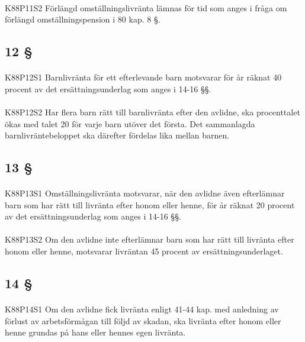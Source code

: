 \documentclass[a4paper,notitlepage,openany,10pt]{book}
\begin{document}
\paragraph*{}
{\tiny K88P11S2}
Förlängd omställningslivränta lämnas för tid som anges i fråga om förlängd omställningspension i 80 kap. 8 §.
\subsection*{12 §}
\paragraph*{}
{\tiny K88P12S1}
Barnlivränta för ett efterlevande barn motsvarar för år räknat 40 procent av det ersättningsunderlag som anges i 14-16 §§.
\paragraph*{}
{\tiny K88P12S2}
Har flera barn rätt till barnlivränta efter den avlidne, ska procenttalet ökas med talet 20 för varje barn utöver det första. Det sammanlagda barnlivräntebeloppet ska därefter fördelas lika mellan barnen.
\subsection*{13 §}
\paragraph*{}
{\tiny K88P13S1}
Omställningslivränta motsvarar, när den avlidne även efterlämnar barn som har rätt till livränta efter honom eller henne, för år räknat 20 procent av det ersättningsunderlag som anges i 14-16 §§.
\paragraph*{}
{\tiny K88P13S2}
Om den avlidne inte efterlämnar barn som har rätt till livränta efter honom eller henne, motsvarar livräntan 45 procent av ersättningsunderlaget.
\subsection*{14 §}
\paragraph*{}
{\tiny K88P14S1}
Om den avlidne fick livränta enligt 41-44 kap. med anledning av förlust av arbetsförmågan till följd av skadan, ska livränta efter honom eller henne grundas på hans eller hennes egen livränta.
\end{document}
